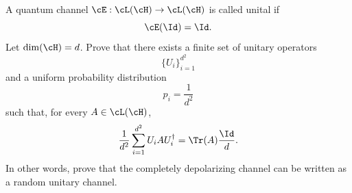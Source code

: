 A quantum channel $\cE:\cL(\cH)\to \cL(\cH)$ is called unital if
$$
\cE(\Id)=\Id.
$$
Let $\dim(\cH)=d$. Prove that there exists a finite set of unitary operators
$$
\{U_i\}_{i=1}^{d^2}
$$
and a uniform probability distribution
$$
p_i=\frac{1}{d^2}
$$
such that, for every $A\in \cL(\cH)$,
$$
\frac{1}{d^2}\sum_{i=1}^{d^2} U_i A U_i^\dagger
=
\Tr(A)\frac{\Id}{d}.
$$
In other words, prove that the completely depolarizing channel can be written as a random unitary channel.
